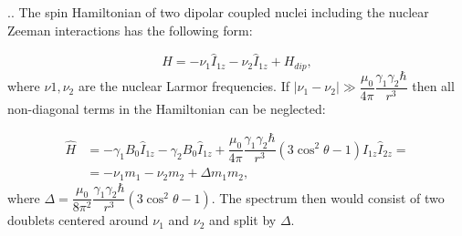 \documentclass{beamer}
\begin{document}
\begin{frame}{\thesection.\thesubsection. \insertsubsection}
	The spin Hamiltonian of two dipolar coupled nuclei including the nuclear Zeeman interactions has the following form:
	
	\begin{equation}
	  \hat{H} = -\nu_1 \hat{I}_{1z} -\nu_2 \hat{I}_{1z}  + H_{dip},
	\end{equation}
    where $\nu1,\nu_2$ are the nuclear Larmor frequencies. If  $\mid \nu_1 -\nu_2 \mid \gg \dfrac{\mu_0}{4 \pi} \dfrac{\gamma_1 \gamma_2 \hbar}{r^3}$ then all non-diagonal terms in the Hamiltonian can be neglected:
	
	\begin{align}
	\hat{H} &= -\gamma_1 B_0 \hat{I}_{1z} -\gamma_2 B_0 \hat{I}_{1z}  + \dfrac{\mu_0}{4 \pi} \dfrac{\gamma_1 \gamma_2 \hbar}{r^3} (3 \cos^2 \theta -1)  \hat{I}_{1z} \hat{I}_{2z} =  \\
	&= -\nu_1 m_1 - \nu_2 m_2 + \Delta m_1 m_2,
	\end{align}
	where $\Delta = \dfrac{\mu_0}{8 \pi^2} \dfrac{\gamma_1 \gamma_2 \hbar}{r^3} (3 \cos^2 \theta -1)$.
	The spectrum then would consist of two doublets centered around $\nu_1$ and $\nu_2$ and split by $\Delta$.
	
	
	
	

    
\end{frame}
\end{document}
